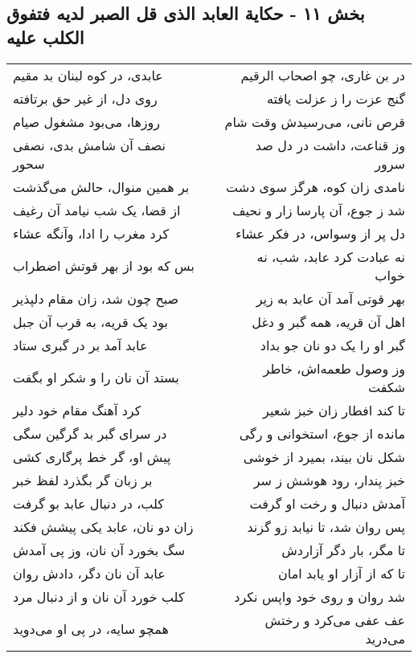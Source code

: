 \begin{center}
\section*{بخش ۱۱ - حکایة العابد الذی قل الصبر لدیه فتفوق الکلب علیه}
\label{sec:011}
\begin{longtable}{l p{0.5cm} r}
عابدی، در کوه لبنان بد مقیم
&&
در بن غاری، چو اصحاب الرقیم
\\
روی دل، از غیر حق برتافته
&&
گنج عزت را ز عزلت یافته
\\
روزها، می‌بود مشغول صیام
&&
قرص نانی، می‌رسیدش وقت شام
\\
نصف آن شامش بدی، نصفی سحور
&&
وز قناعت، داشت در دل صد سرور
\\
بر همین منوال، حالش می‌گذشت
&&
نامدی زان کوه، هرگز سوی دشت
\\
از قضا، یک شب نیامد آن رغیف
&&
شد ز جوع، آن پارسا زار و نحیف
\\
کرد مغرب را ادا، وآنگه عشاء
&&
دل پر از وسواس، در فکر عشاء
\\
بس که بود از بهر قوتش اضطراب
&&
نه عبادت کرد عابد، شب، نه خواب
\\
صبح چون شد، زان مقام دلپذیر
&&
بهر قوتی آمد آن عابد به زیر
\\
بود یک قریه، به قرب آن جبل
&&
اهل آن قریه، همه گبر و دغل
\\
عابد آمد بر در گبری ستاد
&&
گبر او را یک دو نان جو بداد
\\
بستد آن نان را و شکر او بگفت
&&
وز وصول طعمه‌اش، خاطر شکفت
\\
کرد آهنگ مقام خود دلیر
&&
تا کند افطار زان خبز شعیر
\\
در سرای گبر بد گرگین سگی
&&
مانده از جوع، استخوانی و رگی
\\
پیش او، گر خط پرگاری کشی
&&
شکل نان بیند، بمیرد از خوشی
\\
بر زبان گر بگذرد لفظ خبر
&&
خبز پندار، رود هوشش ز سر
\\
کلب، در دنبال عابد بو گرفت
&&
آمدش دنبال و رخت او گرفت
\\
زان دو نان، عابد یکی پیشش فکند
&&
پس روان شد، تا نیابد زو گزند
\\
سگ بخورد آن نان، وز پی آمدش
&&
تا مگر، بار دگر آزاردش
\\
عابد آن نان دگر، دادش روان
&&
تا که از آزار او یابد امان
\\
کلب خورد آن نان و از دنبال مرد
&&
شد روان و روی خود واپس نکرد
\\
همچو سایه، در پی او می‌دوید
&&
عف عفی می‌کرد و رختش می‌درید
\\

\end{longtable}
\end{center}
